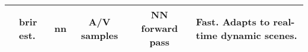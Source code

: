 \begin{landscape}
\begin{table}[tbp]
\begin{tabularx}{\linewidth}{llcccX}
                \cite{chen2023everywhere}                         & \acrshort{brir} est.     & \acrshort{nn}  & A/V samples                   & NN forward pass     & Fast\footnotemark[3]. Adapts to real-time dynamic scenes.\\ \bottomrule
            \end{tabularx}\label{tab:visual-acoustic-mapping}
        \end{table}
\end{landscape}
